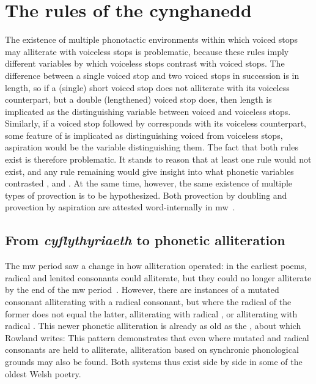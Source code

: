 \section{The rules of the cynghanedd}
\label{sec:rules-cynghanedd}

The existence of multiple phonotactic environments within which voiced stops may alliterate with voiceless stops is problematic, because these rules imply different variables by which voiceless stops contrast with voiced stops. The difference between a single voiced stop and two voiced stops in succession is in length, so if a (single) short voiced stop does not alliterate with its voiceless counterpart, but a double (lengthened) voiced stop does, then  length is implicated as the distinguishing variable between voiced and voiceless stops. Similarly, if a voiced stop followed by  corresponds with its voiceless counterpart, some feature of  is implicated as distinguishing voiced from voiceless stops, \ie aspiration would be the variable distinguishing them. The fact that both rules exist is therefore problematic. It stands to reason that at least one rule would not exist, and any rule remaining would give insight into what phonetic variables contrasted , and . At the same time, however, the same existence of multiple types of provection is to be hypothesized. Both provection by doubling and provection by aspiration are attested word-internally in \gls{mw}~\autocite[§~17]{evans_grammar_1964}.

\subsection{From \textit{cyflythyriaeth} to phonetic alliteration}
\label{sec:from-allit-text}
The \gls{mw} period saw a change in how alliteration operated: in the earliest poems, radical and lenited consonants could alliterate, but they could no longer alliterate by the end of the \gls{mw} period~\autocite[339]{rowland_early_1990}. However, there are instances of a mutated consonant alliterating with a radical consonant, but where the radical of the former does not equal the latter, \eg {} alliterating with radical , or  alliterating with radical . This newer phonetic alliteration is already as old as the , about which Rowland writes: 
This pattern demonstrates that even where mutated and radical consonants are held to alliterate, alliteration based on synchronic phonological grounds may also be found. Both systems thus exist side by side in some of the oldest Welsh poetry. 

